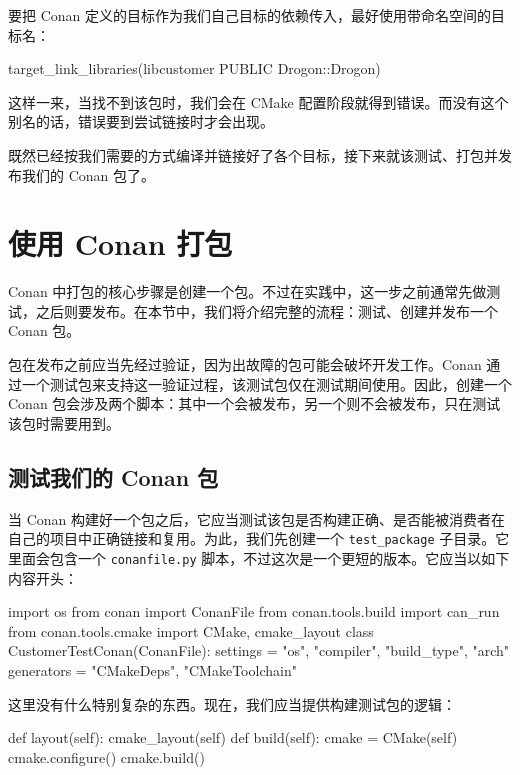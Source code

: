 要把 Conan 定义的目标作为我们自己目标的依赖传入，最好使用带命名空间的目标名：

\begin{codebox}[text]
 target_link_libraries(libcustomer PUBLIC Drogon::Drogon)
\end{codebox}

这样一来，当找不到该包时，我们会在 CMake 配置阶段就得到错误。而没有这个别名的话，错误要到尝试链接时才会出现。

既然已经按我们需要的方式编译并链接好了各个目标，接下来就该测试、打包并发布我们的 Conan 包了。

\section{使用 Conan 打包}

\label{idx:737}
Conan 中打包的核心步骤是创建一个包。不过在实践中，这一步之前通常先做测试，之后则要发布。在本节中，我们将介绍完整的流程：测试、创建并发布一个 Conan 包。

包在发布之前应当先经过验证，因为出故障的包可能会破坏开发工作。Conan 通过一个测试包来支持这一验证过程，该测试包仅在测试期间使用。因此，创建一个 Conan 包会涉及两个脚本：其中一个会被发布，另一个则不会被发布，只在测试该包时需要用到。

\subsection{测试我们的 Conan 包}

\label{idx:738}
当 Conan 构建好一个包之后，它应当测试该包是否构建正确、是否能被消费者在自己的项目中正确链接和复用。为此，我们先创建一个 \texttt{test\_\allowbreak{}package} 子目录。它里面会包含一个 \texttt{conanfile.\allowbreak{}py} 脚本，不过这次是一个更短的版本。它应当以如下内容开头：

\begin{codebox}[python]
import os
from conan import ConanFile
from conan.tools.build import can_run
from conan.tools.cmake import CMake, cmake_layout
class CustomerTestConan(ConanFile):
    settings = "os", "compiler", "build_type", "arch"
    generators = "CMakeDeps", "CMakeToolchain"
\end{codebox}

这里没有什么特别复杂的东西。现在，我们应当提供构建测试包的逻辑：

\begin{codebox}[python]
    def layout(self):
        cmake_layout(self)
    def build(self):
        cmake = CMake(self)
        cmake.configure()
        cmake.build()
\end{codebox}

